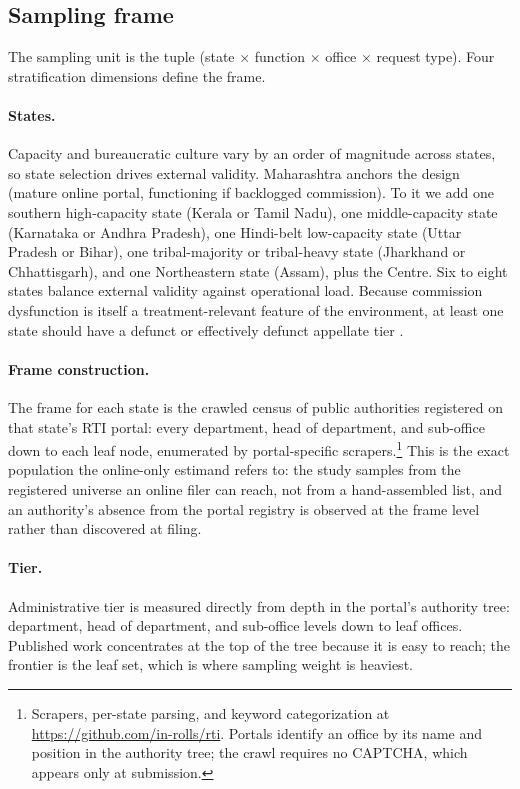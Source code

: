 \documentclass[11pt]{article}
\begin{document}
\subsection{Sampling frame}
\label{sec:sampling}

The sampling unit is the tuple (state $\times$ function $\times$ office $\times$ request type). Four stratification dimensions define the frame.

\paragraph{States.} Capacity and bureaucratic culture vary by an order of magnitude across states, so state selection drives external validity. Maharashtra anchors the design (mature online portal, functioning if backlogged commission). To it we add one southern high-capacity state (Kerala or Tamil Nadu), one middle-capacity state (Karnataka or Andhra Pradesh), one Hindi-belt low-capacity state (Uttar Pradesh or Bihar), one tribal-majority or tribal-heavy state (Jharkhand or Chhattisgarh), and one Northeastern state (Assam), plus the Centre. Six to eight states balance external validity against operational load. Because commission dysfunction is itself a treatment-relevant feature of the environment, at least one state should have a defunct or effectively defunct appellate tier \citep{sns2025}.

\paragraph{Frame construction.} The frame for each state is the crawled census of public authorities registered on that state's RTI portal: every department, head of department, and sub-office down to each leaf node, enumerated by portal-specific scrapers.\footnote{Scrapers, per-state parsing, and keyword categorization at \url{https://github.com/in-rolls/rti}. Portals identify an office by its name and position in the authority tree; the crawl requires no CAPTCHA, which appears only at submission.} This is the exact population the online-only estimand refers to: the study samples from the registered universe an online filer can reach, not from a hand-assembled list, and an authority's absence from the portal registry is observed at the frame level rather than discovered at filing.

\paragraph{Tier.} Administrative tier is measured directly from depth in the portal's authority tree: department, head of department, and sub-office levels down to leaf offices. Published work concentrates at the top of the tree because it is easy to reach; the frontier is the leaf set, which is where sampling weight is heaviest.
\end{document}
